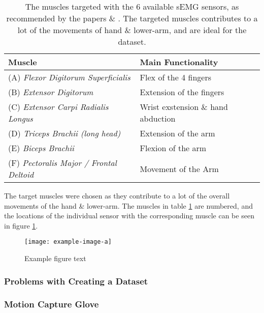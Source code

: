 \documentclass[../main.tex]{subfiles}
\begin{document}
\begin{table}[h]
\begin{center}
\begin{tabular}{ |l|l| } 
\hline
Muscle & Main Functionality \\ 
\hline
(A)  \textit{Flexor Digitorum Superficialis} & Flex of the 4 fingers \\
(B)  \textit{Extensor Digitorum} & Extension of the fingers \\
(C)  \textit{Extensor Carpi Radialis Longus} & Wrist exstension \& hand abduction \\
(D)  \textit{Triceps Brachii (long head)} & Extension of the arm \\
(E)  \textit{Biceps Brachii} & Flexion of the arm \\
(F)  \textit{Pectoralis Major / Frontal Deltoid} & Movement of the Arm \\
\hline
\end{tabular}
\caption{The muscles targeted with the 6 available sEMG sensors, as recommended by the papers  \cite{jarque2019} \& \cite{Batzianoulis2018}.
 The targeted muscles contributes to a lot of the movements of hand \& lower-arm, and are ideal for the dataset.
}
\label{tab:muscletargets}
\end{center}
\end{table}

The target muscles were chosen as they contribute to a lot of the overall movements of the hand \& lower-arm.
The muscles in table \ref{tab:muscletargets} are numbered, and the locations of the individual sensor with the corresponding muscle can be seen in figure \ref{fig:musclesensors}.

\begin{figure}[h]
\begin{center}
\texttt{[image: example-image-a]}
\caption{Example figure text}
\label{fig:musclesensors}
\end{center}
\end{figure}

\subsubsection{Problems with Creating a Dataset}



\subsubsection{Motion Capture Glove}
\end{document}
